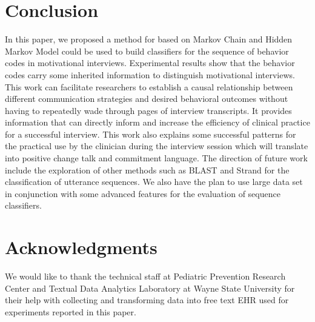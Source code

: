 \documentclass{amia}
\begin{document}
\section*{Conclusion}
In this paper, we proposed a method for based on Markov Chain and Hidden Markov Model could be used to build classifiers for the sequence of behavior codes in motivational interviews. Experimental results show that the behavior codes carry some inherited information to distinguish motivational interviews. This work can facilitate researchers to establish a causal relationship between different communication strategies and desired behavioral outcomes without having to repeatedly wade through pages of interview transcripts. It provides information that can directly inform and increase the efficiency of clinical practice for a successful interview. This work also explains some successful patterns for the practical use by the clinician during the interview session which will translate into positive change talk and commitment language. The direction of future work include the exploration of other methods such as BLAST \cite{altschul1990basic} and Strand \cite{drew2014strand} for the classification of utterance sequences. We also have the plan to use large data set in conjunction with some advanced features for the evaluation of sequence classifiers. 


\section*{Acknowledgments}
We would like to thank the technical staff at Pediatric Prevention Research Center and Textual Data Analytics Laboratory at Wayne State University for their help with collecting and transforming data into free text EHR used for experiments reported in this paper. 



\end{document}
